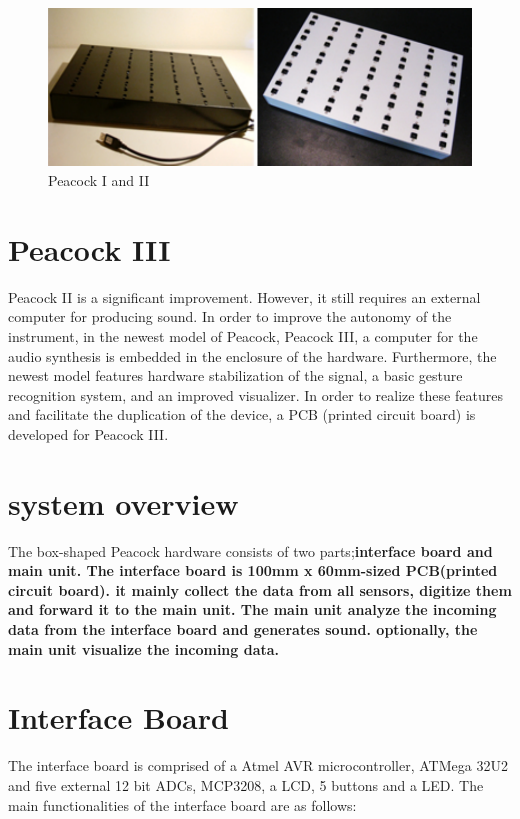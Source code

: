 \documentclass{nime-alternate}
\begin{document}
\begin{figure}[h]
       \centering
       \includegraphics[width=1\columnwidth]{peacocks}
       \caption{Peacock I and II}
       \label{fig:old_peacock}
\end{figure}

\section{Peacock III}

Peacock II is a significant improvement. However, it still requires an external computer for producing sound. 
In order to improve the autonomy of the instrument, in the newest model of Peacock, Peacock III, a computer for the audio synthesis is embedded in the enclosure of the hardware. Furthermore, the newest model features hardware stabilization of the signal, a basic gesture recognition system, and an improved visualizer. In order to realize these features and facilitate the duplication of the device, a PCB (printed circuit board) is developed for Peacock III.

\section{system overview} %

The box-shaped Peacock hardware consists of two parts;\bf{interface board} and \bf{main unit}.
The interface board is 100mm x 60mm-sized PCB(printed circuit board). it mainly collect the data from all sensors, digitize them and forward it to the main unit. The main unit analyze the incoming data from the interface board and generates sound. optionally, the main unit visualize the incoming data.

\section{Interface Board} %

The interface board is comprised of a Atmel AVR microcontroller, ATMega 32U2 and five external 12 bit ADCs, MCP3208, a LCD, 5 buttons and a LED. The main functionalities of the interface board are as follows:
\end{document}
